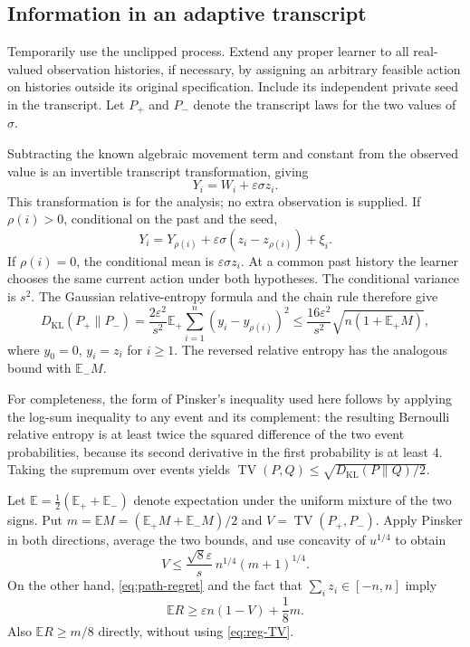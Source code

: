 \documentclass[11pt]{article}
\theoremstyle{definition}
\newcommand{\E}{\mathbb E}
\newcommand{\KL}{D_{\mathrm{KL}}}
\newcommand{\TV}{\operatorname{TV}}
\begin{document}
\subsection{Information in an adaptive transcript}

Temporarily use the unclipped process. Extend any proper learner to all real-valued observation histories, if necessary, by assigning an arbitrary feasible action on histories outside its original specification. Include its independent private seed in the transcript. Let $P_+$ and $P_-$ denote the transcript laws for the two values of $\sigma$.

Subtracting the known algebraic movement term and constant from the observed value is an invertible transcript transformation, giving
\[
 Y_i=W_i+\varepsilon\sigma z_i.
\]
This transformation is for the analysis; no extra observation is supplied. If $\rho(i)>0$, conditional on the past and the seed,
\[
 Y_i=Y_{\rho(i)}+\varepsilon\sigma(z_i-z_{\rho(i)})+\xi_i.
\]
If $\rho(i)=0$, the conditional mean is $\varepsilon\sigma z_i$. At a common past history the learner chooses the same current action under both hypotheses. The conditional variance is $s^2$. The Gaussian relative-entropy formula and the chain rule therefore give
\begin{equation}\label{eq:KL}
 \KL(P_+\|P_-)
 =\frac{2\varepsilon^2}{s^2}\E_+\sum_{i=1}^n(y_i-y_{\rho(i)})^2
 \leq\frac{16\varepsilon^2}{s^2}\sqrt{n(1+\E_+M)},
\end{equation}
where $y_0=0$, $y_i=z_i$ for $i\geq1$. The reversed relative entropy has the analogous bound with $\E_-M$.

For completeness, the form of Pinsker's inequality used here follows by applying the log-sum inequality to any event and its complement: the resulting Bernoulli relative entropy is at least twice the squared difference of the two event probabilities, because its second derivative in the first probability is at least $4$. Taking the supremum over events yields $\TV(P,Q)\leq\sqrt{\KL(P\|Q)/2}$.

Let $\E=\tfrac12(\E_++\E_-)$ denote expectation under the uniform mixture of the two signs. Put $m=\E M=(\E_+M+\E_-M)/2$ and $V=\TV(P_+,P_-)$. Apply Pinsker in both directions, average the two bounds, and use concavity of $u^{1/4}$ to obtain
\begin{equation}\label{eq:TV}
 V\leq\frac{\sqrt8\varepsilon}{s}\,n^{1/4}(m+1)^{1/4}.
\end{equation}
On the other hand, \eqref{eq:path-regret} and the fact that $\sum_i z_i\in[-n,n]$ imply
\begin{equation}\label{eq:reg-TV}
 \E R\geq\varepsilon n(1-V)+\frac18m.
\end{equation}
Also $\E R\geq m/8$ directly, without using \eqref{eq:reg-TV}.
\end{document}
